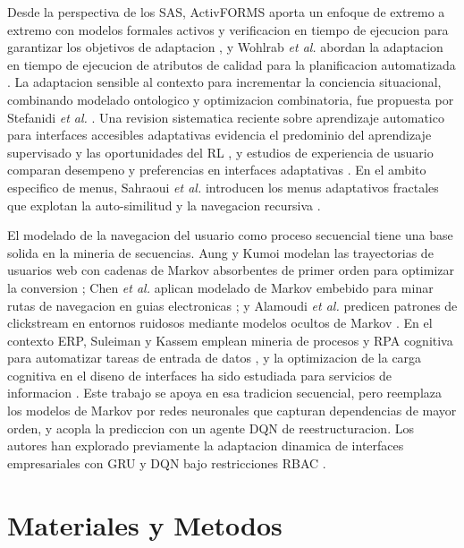 \documentclass[conference]{IEEEtran}
\begin{document}
Desde la perspectiva de los SAS, ActivFORMS aporta un enfoque de extremo a extremo con modelos formales activos y verificacion en tiempo de ejecucion para garantizar los objetivos de adaptacion \cite{b_activforms}, y Wohlrab \textit{et al.} abordan la adaptacion en tiempo de ejecucion de atributos de calidad para la planificacion automatizada \cite{b_wohlrab}. La adaptacion sensible al contexto para incrementar la conciencia situacional, combinando modelado ontologico y optimizacion combinatoria, fue propuesta por Stefanidi \textit{et al.} \cite{b_stefanidi}. Una revision sistematica reciente sobre aprendizaje automatico para interfaces accesibles adaptativas evidencia el predominio del aprendizaje supervisado y las oportunidades del RL \cite{b_kristic}, y estudios de experiencia de usuario comparan desempeno y preferencias en interfaces adaptativas \cite{b_gaspar}. En el ambito especifico de menus, Sahraoui \textit{et al.} introducen los menus adaptativos fractales que explotan la auto-similitud y la navegacion recursiva \cite{b_fractal}.

El modelado de la navegacion del usuario como proceso secuencial tiene una base solida en la mineria de secuencias. Aung y Kumoi modelan las trayectorias de usuarios web con cadenas de Markov absorbentes de primer orden para optimizar la conversion \cite{b_aung}; Chen \textit{et al.} aplican modelado de Markov embebido para minar rutas de navegacion en guias electronicas \cite{b_chen}; y Alamoudi \textit{et al.} predicen patrones de clickstream en entornos ruidosos mediante modelos ocultos de Markov \cite{b_alamoudi}. En el contexto ERP, Suleiman y Kassem emplean mineria de procesos y RPA cognitiva para automatizar tareas de entrada de datos \cite{b_suleiman}, y la optimizacion de la carga cognitiva en el diseno de interfaces ha sido estudiada para servicios de informacion \cite{b_balasm}. Este trabajo se apoya en esa tradicion secuencial, pero reemplaza los modelos de Markov por redes neuronales que capturan dependencias de mayor orden, y acopla la prediccion con un agente DQN de reestructuracion. Los autores han explorado previamente la adaptacion dinamica de interfaces empresariales con GRU y DQN bajo restricciones RBAC \cite{b_prev}.

\section{Materiales y Metodos}
\end{document}
